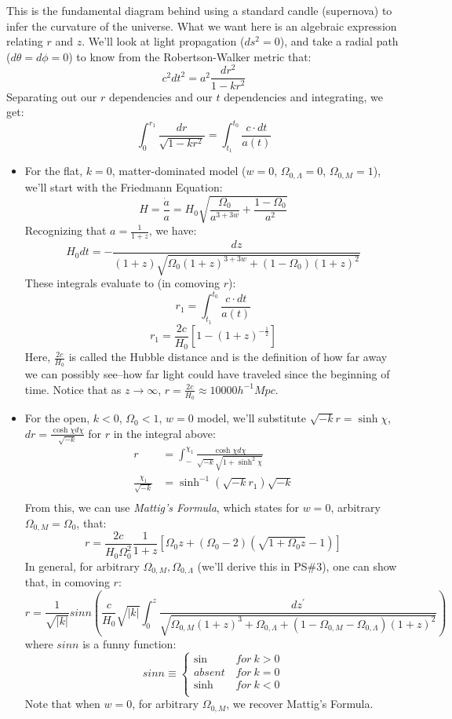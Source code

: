 \documentclass{article}
\def\hf{\frac12}
\def\inv#1{\frac{1}{ #1}}
\def\aa{\frac{\dot a }{ a}}
\def\etot{\Omega_0}
\def\econs{\Omega_{0,\Lambda}}
\def\emat{\Omega_{0,M}}
\def\econs{\Omega_{0,\Lambda}}
\def\p{^\prime}
\def\attw{a^{3+3w}}
\def\hf{\frac12}
\def\etot{\Omega_0}
\def\econs{\Omega_{0,\Lambda}}
\def\emat{\Omega_{0,M}}
\def\econs{\Omega_{0,\Lambda}}
\def\p{^\prime}
\def\attw{a^{3+3w}}
\begin{document}
This is the fundamental diagram behind using a standard candle (supernova) to
infer the curvature of the universe.  What we want here is an algebraic
expression relating $r$ and $z$.  We'll look at light propagation ($ds^2=0$),
and take a radial path ($d\theta=d\phi=0$) to know from the Robertson-Walker
metric that:
$$c^2dt^2=a^2\frac{dr^2}{1-kr^2}$$
Separating out our $r$ dependencies
and our $t$ dependencies and integrating, we get:
$$\int_0^{r_1}\frac{dr}{\sqrt{1-kr^2}}=\int_{t_1}^{t_0}\frac{c\cdot dt}{ a(t)}$$
\begin{itemize}
\item For the flat, $k=0$, matter-dominated model ($w=0$, $\econs=0$, 
$\emat=1$), we'll start with the Friedmann Equation:
$$H=\aa=H_0\sqrt{\frac{\etot}{\attw}+\frac{1-\etot}{ a^2}}$$
Recognizing that $a=\inv{1+z}$, we have:
$$H_0dt=-\frac{dz}{ (1+z)\sqrt{\etot(1+z)^{3+3w}+(1-\etot)(1+z)^2}}$$
These integrals evaluate to (in comoving $r$):
$$r_1=\int_{t_1}^{t_0}\frac{c\cdot dt}{ a(t)}$$
$$\boxed{r_1=\frac{2c}{ H_0}\left[1-(1+z)^{-\hf}\right]}$$
\def\hubd{\frac{2c}{ H_0}}
\def\sqmk{\sqrt{-k}}
Here, $\hubd$ is called the Hubble distance and is the definition of 
how far away we can possibly see--how far light could have traveled since the
beginning of time.  Notice that as $z\to\infty$, $r=\hubd\approx10000h^{-1}Mpc$.

\item For the open, $k<0$, $\etot<1$, $w=0$ model, we'll substitute 
$\sqmk r=\sinh\chi$, $dr=\frac{\cosh\chi d\chi}{\sqmk}$ for $r$ in the integral 
above:
\begin{align}
r&=\int_-^{\chi_1}\frac{\cosh\chi d\chi}{\sqmk\sqrt{1+\sinh^2\chi}}\\
\frac{\chi_1}{\sqmk}&={\sinh^{-1}(\sqmk r_1)}{\sqmk}\\
\end{align}
From this, we can use {\it Mattig's Formula}, which states for $w=0$, 
arbitrary $\emat = \etot$, that:
$$r=\frac{2c}{ H_0\etot^2}\inv{1+z}\left[\etot z+(\etot-2)(\sqrt{1+\etot z}
-1)\right]$$
In general, for arbitrary $\emat, \econs$ (we'll derive this in PS\#3), one
can show that, in comoving $r$:
\def\sqak{\sqrt{|k|}}
$$
\boxed{r=\inv{\sqak}sinn\left(\frac{c}{ H_0}\sqak 
\int_0^z\frac{dz\p}{ \sqrt{\emat(1+z)^3+\econs+(1-\emat-\econs)(1+z)^2}}
\right)}$$
where $sinn$ is a funny function: 
$$sinn\equiv\begin{cases}\sin&\,for\ k>0\\
absent&\,for\ k=0\\
\sinh&\,for\ k<0\\\end{cases}$$
Note that when $w=0$, for arbitrary $\emat$, we recover Mattig's Formula.
\end{itemize}
\end{document}
